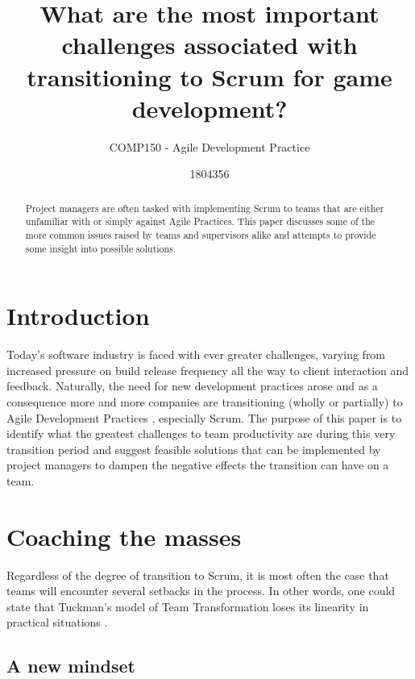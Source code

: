 \documentclass{scrartcl}
\title{What are the most important challenges associated with transitioning to Scrum for game development?}
\subtitle{COMP150 - Agile Development Practice}
\author{1804356}
\begin{document}
\maketitle

\begin{abstract}
    Project managers are often tasked with implementing Scrum to teams that are either unfamiliar with or simply against Agile Practices. This paper discusses some of the more common issues raised by teams and supervisors alike and attempts to provide some insight into possible solutions. 
\end{abstract}

\section{Introduction}

  Today's software industry is faced with ever greater challenges, varying from increased pressure on build release frequency all the way to client interaction and feedback. Naturally, the need for new development practices arose and as a consequence more and more companies are transitioning (wholly or partially) to Agile Development Practices \cite{AgileManifesto}, especially Scrum\cite{Scrum, SCRUMProcess}. The purpose of this paper is to identify what the greatest challenges to team productivity are during this very transition period and suggest feasible solutions that can be implemented by project managers to dampen the negative effects the transition can have on a team.
  
 
    \section{Coaching the masses}
    
     Regardless of the degree of transition to Scrum, it is most often the case that teams will encounter several setbacks in the process. In other words, one could state that Tuckman's model of Team Transformation \cite{tuckmanModel} loses its linearity in practical situations \cite{4599458}. 
     
    \subsection{A new mindset}
    
\end{document}
